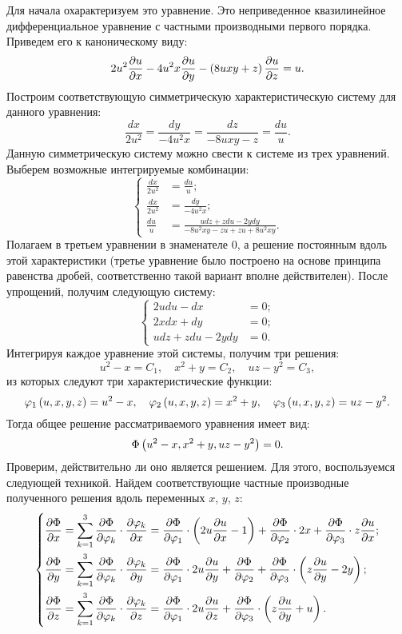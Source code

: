 		Для начала охарактеризуем это уравнение. Это неприведенное квазилинейное дифференциальное уравнение с частными производными первого порядка. Приведем его к каноническому виду:
		\[ 2u^2 \dfrac{\partial u}{\partial x} - 4 u^2 x \dfrac{\partial u}{\partial y} - \left(  8uxy + z  \right) \dfrac{\partial u}{\partial z} = u. \]
		Построим соответствующую симметрическую характеристическую систему для данного уравнения:
		\[ \frac{dx}{2u^2} = \frac{dy}{-4 u^2 x} = \frac{dz}{-8uxy - z} = \frac{du}{u}. \]
		Данную симметрическую систему можно свести к системе из трех уравнений. Выберем возможные интегрируемые комбинации:
		\[ \left\lbrace \begin{split}
			\frac{dx}{2u^2} &= \frac{du}{u}; \\
			\frac{dx}{2u^2} &= \frac{dy}{-4u^2 x}; \\
			\frac{du}{u} &= \frac{u dz + z du - 2y dy}{- 8 u^2 xy - zu + zu + 8 u^2 x y}.
		\end{split} \right. \] 
		Полагаем в третьем уравнении в знаменателе $0$, а решение постоянным вдоль этой характеристики (третье уравнение было построено на основе принципа равенства дробей, соответственно такой вариант вполне действителен). После упрощений, получим следующую систему:
		\[ \left\lbrace \begin{split}
			2u du - dx &= 0; \\
			2x dx + dy &= 0; \\
			u dz + z du - 2y dy &= 0.
		\end{split} \right. \] 
		Интегрируя каждое уравнение этой системы, получим три решения:
		\[ u^2 - x = C_1, \quad x^2 + y = C_2, \quad uz - y^2 = C_3, \]
		из которых следуют три характеристические функции:
		\[ \varphi_1 \left( u, x, y, z \right) = u^2 - x, \quad \varphi_2 \left( u, x, y, z \right) = x^2 + y, \quad \varphi_3 \left( u, x, y, z \right) = uz - y^2. \] 
		Тогда общее решение рассматриваемого уравнения имеет вид:
		\[ \Phi \left( u^2 - x, x^2 + y, uz - y^2 \right) = 0. \]
		Проверим, действительно ли оно является решением. Для этого, воспользуемся следующей техникой. Найдем соответствующие частные производные полученного решения вдоль переменных $x$, $y$, $z$:
		\[ \left\lbrace \begin{split}
			\dfrac{\partial \Phi}{\partial x} 
				&= \sum_{k = 1}^{3} \dfrac{\partial \Phi}{\partial \varphi_k} \cdot \dfrac{\partial \varphi_k}{\partial x} 
					= \dfrac{\partial \Phi}{\partial \varphi_1} \cdot \left( 2u \dfrac{\partial u}{\partial x} - 1 \right) 
					+ \dfrac{\partial \Phi}{\partial \varphi_2} \cdot 2x 
					+ \dfrac{\partial \Phi}{\partial \varphi_3} \cdot z \dfrac{\partial u}{\partial x}
			; \\
			\dfrac{\partial \Phi}{\partial y} 
				&= \sum_{k = 1}^{3} \dfrac{\partial \Phi}{\partial \varphi_k} \cdot \dfrac{\partial \varphi_k}{\partial y} 
					= \dfrac{\partial \Phi}{\partial \varphi_1} \cdot 2u \dfrac{\partial u}{\partial y} 
					+ \dfrac{\partial \Phi}{\partial \varphi_2} 
					+ \dfrac{\partial \Phi}{\partial \varphi_3} \cdot \left( z \dfrac{\partial u}{\partial y} - 2y \right)
			; \\
			\dfrac{\partial \Phi}{\partial z} 
				&= \sum_{k = 1}^{3} \dfrac{\partial \Phi}{\partial \varphi_k} \cdot \dfrac{\partial \varphi_k}{\partial z} 
					= \dfrac{\partial \Phi}{\partial \varphi_1} \cdot 2u \dfrac{\partial u}{\partial z} 
					+ \dfrac{\partial \Phi}{\partial \varphi_3} \cdot \left( z \dfrac{\partial u}{\partial y} + u \right)
			.
		\end{split} \right. \] 
		
